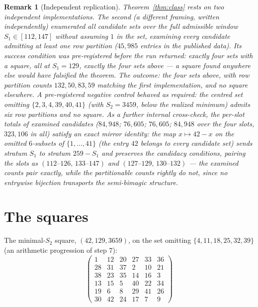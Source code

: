 \documentclass[11pt]{article}
\newtheorem{remark}[theorem]{Remark}
\begin{document}
\begin{remark}[Independent replication]\label{rem:replication}
Theorem~\ref{thm:class} rests on two independent implementations. The
second (a different framing, written independently) enumerated all
candidate sets over the \emph{full} admissible window
$S_1\in[112,147]$ without assuming $1$ in the set, examining every
candidate admitting at least one row partition ($45{,}985$ entries in
the published data). Its success condition was pre-registered before
the run returned: exactly four sets with a square, all at $S_1=129$,
exactly the four sets above --- a square found anywhere else would have
falsified the theorem. The outcome: the four sets above, with row
partition counts $132, 50, 83, 59$ matching the first implementation,
and no square elsewhere. A pre-registered negative control behaved as
required: the centred set omitting $\{2,3,4,39,40,41\}$ (with
$S_2=3459$, \emph{below} the realized minimum) admits six row
partitions and no square. As a further internal cross-check, the
per-slot totals of examined candidates ($84{,}948$; $76{,}605$;
$76{,}605$; $84{,}948$ over the four slots, $323{,}106$ in all)
satisfy an exact mirror identity: the map $x\mapsto 42-x$ on the
omitted $6$-subsets of $\{1,\dots,41\}$ (the entry $42$ belongs to
every candidate set) sends stratum $S_1$ to stratum $259-S_1$ and
preserves the candidacy conditions, pairing the slots as
$(112\text{--}126,\,133\text{--}147)$ and
$(127\text{--}129,\,130\text{--}132)$ --- the examined counts pair
exactly, while the partitionable counts rightly do not, since no
entrywise bijection transports the semi-bimagic structure.
\end{remark}

\section{The squares}\label{sec:squares}

The minimal-$S_2$ square, $(42,129,3659)$, on the set omitting
$\{4,11,18,25,32,39\}$ (an arithmetic progression of step $7$):
\[
\begin{pmatrix}
 1 & 12 & 20 & 27 & 33 & 36\\
28 & 31 & 37 &  2 & 10 & 21\\
38 & 23 & 35 & 14 & 16 &  3\\
13 & 15 &  5 & 40 & 22 & 34\\
19 &  6 &  8 & 29 & 41 & 26\\
30 & 42 & 24 & 17 &  7 &  9
\end{pmatrix}
\]
\end{document}

